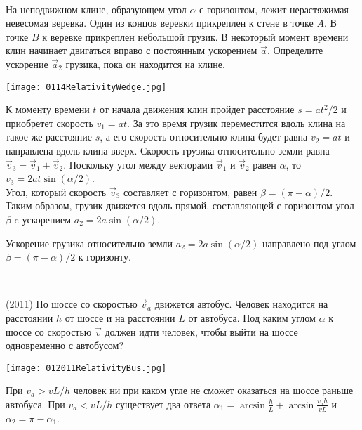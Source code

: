 \begin{ex}
\hspace{0pt} \\
\begin{minipage}{.65\textwidth}
На неподвижном клине, образующем угол $\alpha$  с горизонтом, лежит нерастяжимая невесомая веревка. Один из концов веревки прикреплен к стене в точке $A$. В точке $B$ к веревке прикреплен небольшой грузик. В некоторый момент времени клин начинает двигаться вправо с постоянным ускорением $\vec{a}$. Определите ускорение $\vec{a}_2$ грузика, пока он находится на клине.
\end{minipage}
\begin{minipage}{.35\textwidth}
\centering
\texttt{[image: 0114RelativityWedge.jpg]}
\end{minipage}
\begin{sol}
К моменту времени $t$ от начала движения клин пройдет расстояние $s = at^2/2$ и приобретет скорость $v_1 = at$. За это время грузик переместится вдоль клина на такое же расстояние $s$, а его скорость относительно клина будет равна $v_2 = at$ и направлена вдоль клина вверх. Скорость грузика относительно земли равна $\vec{v}_3 = \vec{v}_1 + \vec{v}_2$. Поскольку угол между векторами $\vec{v}_1$ и $\vec{v}_2$ равен $\alpha$, то $v_3 = 2at \sin (\alpha /2)$. \\ 
Угол, который скорость $\vec{v}_3$ составляет с горизонтом, равен $\beta  = (\pi - \alpha)/2$. Таким образом, грузик движется вдоль прямой, составляющей с горизонтом угол $\beta$ c ускорением $a_2 = 2a \sin (\alpha /2)$.
\end{sol}
\begin{ans}
Ускорение грузика относительно земли $a_2 = 2a \sin (\alpha /2)$ направлено под углом $\beta  = (\pi - \alpha)/2$ к горизонту.
\end{ans}
\end{ex}

\begin{ex}
\hspace{0pt} \\
\begin{minipage}{.65\textwidth}
(2011) По шоссе со скоростью $\vec{v}_a$ движется автобус. Человек находится на расстоянии $h$ от шоссе и на расстоянии $L$ от автобуса. 
Под каким углом $\alpha$ к шоссе со скоростью $\vec v$  должен идти человек, чтобы выйти на шоссе одновременно с автобусом?
\end{minipage}
\begin{minipage}{.35\textwidth}
\centering
\texttt{[image: 012011RelativityBus.jpg]}
\end{minipage}
\begin{ans}
При $v_a > vL/h$ человек ни при каком угле не сможет оказаться на шоссе раньше автобуса. При $v_a < vL/h$ существует два ответа $\alpha_1 = \arcsin \frac{h}{L} + \arcsin \frac{v_ah}{vL}$ и $\alpha_2 = \pi - \alpha_1$.
\end{ans}
\end{ex}

